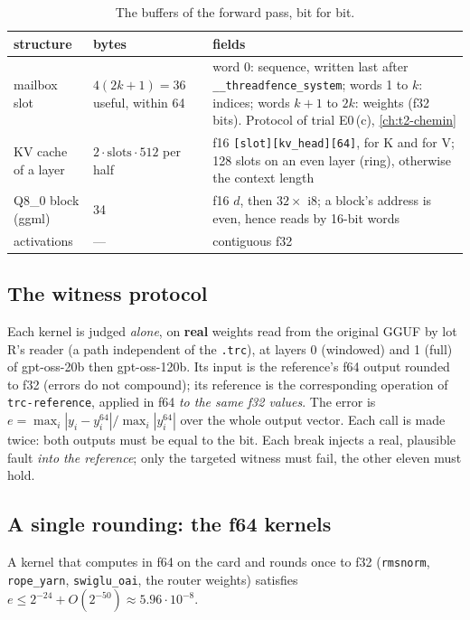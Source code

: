 \begin{table}[!htbp]
\centering\small
\caption[The buffers of the forward pass]{The buffers of the forward pass, bit for bit.}
\label{tab:t2n-tampons}
\begin{tabularx}{\linewidth}{@{}lp{2.6cm}X@{}}
\toprule
structure & bytes & fields \\
\midrule
mailbox slot & $4(2k+1) = 36$ useful, within 64 & word 0: sequence, written last after \texttt{\_\_threadfence\_system}; words 1 to $k$: indices; words $k+1$ to $2k$: weights (f32 bits). Protocol of trial E0\,(c), \cref{ch:t2-chemin} \\
KV cache of a layer & $2 \cdot \text{slots} \cdot 512$ per half & f16 \texttt{[slot][kv\_head][64]}, for K and for V; 128 slots on an even layer (ring), otherwise the context length \\
Q8\_0 block (ggml) & 34 & f16 $d$, then $32 \times$ i8; a block's address is even, hence reads by 16-bit words \\
activations & — & contiguous f32 \\
\bottomrule
\end{tabularx}
\end{table}

\subsection{The witness protocol}

Each kernel is judged \emph{alone}, on \textbf{real} weights read from the original GGUF by lot R's reader (a path independent of the \texttt{.trc}), at layers 0 (windowed) and 1 (full) of gpt-oss-20b then gpt-oss-120b. Its input is the reference's f64 output rounded to f32 (errors do not compound); its reference is the corresponding operation of \texttt{trc-reference}, applied in f64 \emph{to the same f32 values}. The error is $e = \max_i |y_i - y^{64}_i| / \max_i |y^{64}_i|$ over the whole output vector. Each call is made twice: both outputs must be equal to the bit. Each break injects a real, plausible fault \emph{into the reference}; only the targeted witness must fail, the other eleven must hold.

\subsection{A single rounding: the f64 kernels}

\begin{proposition}\label{prop:t2n-un-arrondi}
A kernel that computes in f64 on the card and rounds once to f32 (\texttt{rmsnorm}, \texttt{rope\_yarn}, \texttt{swiglu\_oai}, the router weights) satisfies $e \le 2^{-24} + O(2^{-50}) \approx 5.96\cdot10^{-8}$.
\end{proposition}

